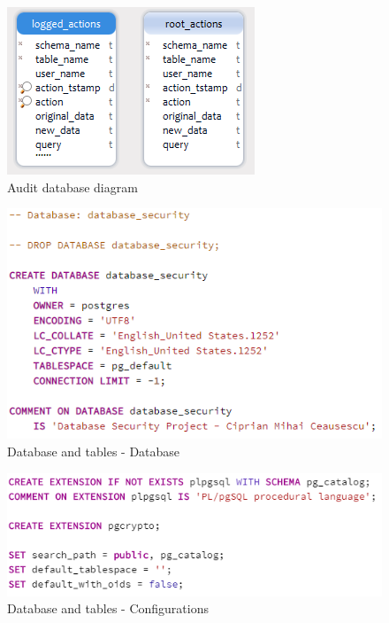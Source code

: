\documentclass{article}
\begin{document}
\begin{figure}
\centering
\includegraphics[scale=1]{Schema_2}
\caption{Audit database diagram}
\end{figure}
\begin{figure}
\centering
\includegraphics[scale=1]{1}
\caption{Database and tables - Database}
\end{figure}
\begin{figure}
\centering
\includegraphics[scale=1]{2}
\caption{Database and tables - Configurations}
\end{figure}
\end{document}
